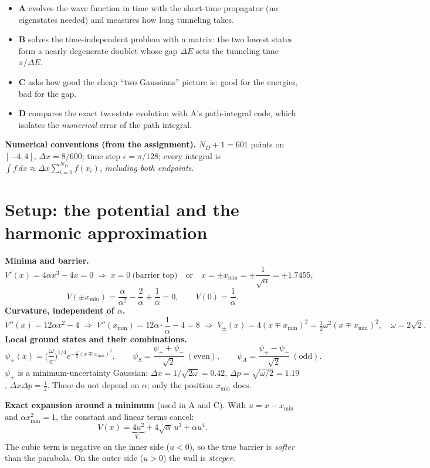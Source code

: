 \documentclass[10pt]{article}
\begin{document}
\begin{itemize}
\item \textbf{A} evolves the wave function in time with the short-time propagator (no eigenstates needed) and measures how long tunneling takes.
\item \textbf{B} solves the time-independent problem with a matrix: the two lowest states form a nearly degenerate doublet whose gap $\Delta E$ sets the tunneling time $\pi/\Delta E$.
\item \textbf{C} asks how good the cheap ``two Gaussians'' picture is: good for the energies, bad for the gap.
\item \textbf{D} compares the exact two-state evolution with A's path-integral code, which isolates the \emph{numerical} error of the path integral.
\end{itemize}

\textbf{Numerical conventions (from the assignment).} $N_D+1=601$ points on $[-4,4]$, $\Delta x=8/600$; time step $\epsilon=\pi/128$; every integral is $\int f\,dx\approx\Delta x\sum_{i=0}^{N_D}f(x_i)$, \emph{including both endpoints}.

\section{Setup: the potential and the harmonic approximation}
\textbf{Minima and barrier.}
\[
V'(x)=4\alpha x^3-4x=0\;\Rightarrow\;x=0\ \text{(barrier top)}\quad\text{or}\quad x=\pm x_{\min}=\pm\frac1{\sqrt\alpha}=\pm1.7455,
\]
\[
V(\pm x_{\min})=\frac{\alpha}{\alpha^2}-\frac2\alpha+\frac1\alpha=0,\qquad V(0)=\frac1\alpha .
\]
\textbf{Curvature, independent of $\alpha$.}
\[
V''(x)=12\alpha x^2-4\;\Rightarrow\;V''(x_{\min})=12\alpha\cdot\frac1\alpha-4=8
\;\Rightarrow\;V_\pm(x)=4(x\mp x_{\min})^2=\tfrac12\omega^2(x\mp x_{\min})^2,\quad\omega=2\sqrt2 .
\]
\textbf{Local ground states and their combinations.}
\[
\psi_\pm(x)=\Big(\frac\omega\pi\Big)^{1/4}e^{-\frac\omega2(x\mp x_{\min})^2},\qquad
\psi_S=\frac{\psi_++\psi_-}{\sqrt2}\ (\text{even}),\qquad \psi_A=\frac{\psi_+-\psi_-}{\sqrt2}\ (\text{odd}).
\]
$\psi_\pm$ is a minimum-uncertainty Gaussian: $\Delta x=1/\sqrt{2\omega}=0.42$, $\Delta p=\sqrt{\omega/2}=1.19$, $\Delta x\Delta p=\tfrac12$. These do not depend on $\alpha$; only the position $x_{\min}$ does.

\textbf{Exact expansion around a minimum} (used in A and C). With $u=x-x_{\min}$ and $\alpha x_{\min}^2=1$, the constant and linear terms cancel:
\[
V(x)=\underbrace{4u^2}_{V_+}+4\sqrt\alpha\,u^3+\alpha u^4 .
\]
The cubic term is negative on the inner side ($u<0$), so the true barrier is \emph{softer} than the parabola. On the outer side ($u>0$) the wall is \emph{steeper}.
\end{document}

